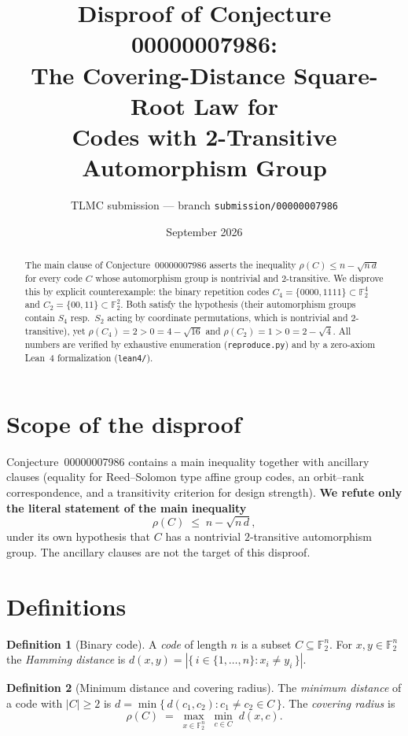 \documentclass[11pt]{article}
\title{Disproof of Conjecture 00000007986:\\
The Covering-Distance Square-Root Law for\\
Codes with 2-Transitive Automorphism Group}
\author{TLMC submission --- branch \texttt{submission/00000007986}}
\date{September 2026}
\theoremstyle{definition}
\newtheorem{definition}{Definition}
\begin{document}
\maketitle

\begin{abstract}
The main clause of Conjecture~00000007986 asserts the inequality
$\rho(C) \le n - \sqrt{n\,d}$ for every code $C$ whose automorphism group is
nontrivial and $2$-transitive. We disprove this by explicit counterexample:
the binary repetition codes $C_4 = \{0000,1111\} \subset \mathbb{F}_2^4$ and
$C_2 = \{00,11\} \subset \mathbb{F}_2^2$. Both satisfy the hypothesis (their
automorphism groups contain $S_4$ resp.\ $S_2$ acting by coordinate
permutations, which is nontrivial and $2$-transitive), yet
$\rho(C_4) = 2 > 0 = 4-\sqrt{16}$ and $\rho(C_2) = 1 > 0 = 2-\sqrt{4}$.
All numbers are verified by exhaustive enumeration
(\texttt{reproduce.py}) and by a zero-axiom Lean~4 formalization (\texttt{lean4/}).
\end{abstract}

\section{Scope of the disproof}

Conjecture~00000007986 contains a main inequality together with ancillary
clauses (equality for Reed--Solomon type affine group codes, an
orbit--rank correspondence, and a transitivity criterion for design
strength). \textbf{We refute only the literal statement of the main
inequality}
\[
\rho(C) \;\le\; n - \sqrt{n\,d},
\]
under its own hypothesis that $C$ has a nontrivial $2$-transitive
automorphism group. The ancillary clauses are not the target of this
disproof.

\section{Definitions}

\begin{definition}[Binary code]
A \emph{code} of length $n$ is a subset $C \subseteq \mathbb{F}_2^n$.
For $x, y \in \mathbb{F}_2^n$ the \emph{Hamming distance} is
$d(x,y) = |\{\, i \in \{1,\dots,n\} : x_i \neq y_i \,\}|$.
\end{definition}

\begin{definition}[Minimum distance and covering radius]
The \emph{minimum distance} of a code with $|C| \ge 2$ is
$d = \min\{\, d(c_1, c_2) : c_1 \neq c_2 \in C \,\}$.
The \emph{covering radius} is
\[
\rho(C) \;=\; \max_{x \in \mathbb{F}_2^n} \; \min_{c \in C} \; d(x, c).
\]
\end{definition}
\end{document}
